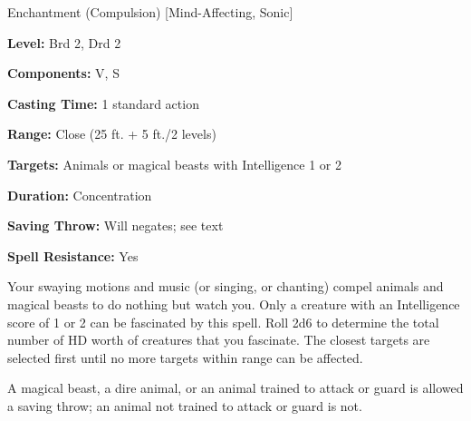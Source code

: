 
Enchantment (Compulsion) [Mind-Affecting, Sonic]

\textbf{Level:} Brd 2, Drd 2

\textbf{Components:} V, S

\textbf{Casting Time:} 1 standard action

\textbf{Range:} Close (25 ft. + 5 ft./2 levels)

\textbf{Targets:} Animals or magical beasts with Intelligence 1 or 2

\textbf{Duration:} Concentration

\textbf{Saving Throw:} Will negates; see text

\textbf{Spell Resistance:} Yes

Your swaying motions and music (or singing, or chanting) compel animals and magical 
beasts to do nothing but watch you. Only a creature with an Intelligence score 
of 1 or 2 can be fascinated by this spell. Roll 2d6 to determine the total number 
of HD worth of creatures that you fascinate. The closest targets are selected first 
until no more targets within range can be affected.

A magical beast, a dire animal, or an animal trained to attack or guard is allowed 
a saving throw; an animal not trained to attack or guard is not.

